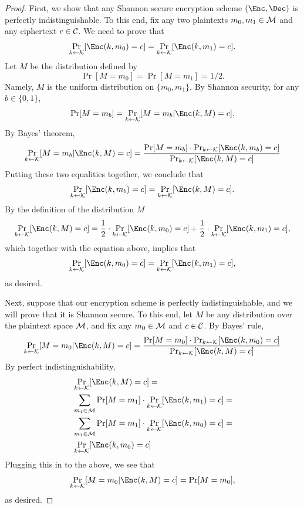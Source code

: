 \begin{proof}
    

 First, we show that any Shannon secure encryption scheme $(\Enc,\Dec)$ is perfectly indistinguishable.  To this end, fix any two plaintexts $m_0,m_1 \in {\cal M}$ and any ciphertext $c \in{\cal C}$.  We need to prove that 
 \[
 \Pr_{k\gets{\cal K}}[\Enc(k,m_0) = c] = \Pr_{k\gets{\cal K}}[\Enc(k,m_1) = c].
 \]
Let $M$ be the distribution defined by 
\[
\Pr[M = m_0] = \Pr[M = m_1] = 1/2.
\]
Namely, $M$ is the uniform distribution on $\{m_0,m_1\}$. By Shannon security, for any $b \in\{0,1\}$,
\[\Pr[M =m_b]= \Pr_{k\gets{\cal K}}[M = m_b | \Enc(k,M) = c] . 
\]
By Bayes’ theorem,
\[
\Pr_{k\gets{\cal K}}[M =m_b | \Enc(k,M) = c] = \frac{\Pr[M = m_b]\cdot \Pr_{k\gets{\cal K}}[\Enc(k,m_b) = c]}{\Pr_{k\gets{\cal K}}[\Enc(k,M) = c]}
\]
Putting these two equalities together, we conclude that \[
{\Pr_{k\gets{\cal K}}[\Enc(k,m_b) = c] }={\Pr_{k\gets{\cal K}}[\Enc(k,M) = c]}.
\]
By the definition of the distribution $M$
\[
{\Pr_{k\gets{\cal K}}[\Enc(k,M) = c]}=\frac12\cdot {\Pr_{k\gets{\cal K}}[\Enc(k,m_0) = c] }+\frac12\cdot {\Pr_{k\gets{\cal K}}[\Enc(k,m_1) = c] },
\]
which together with the equation above, implies that 
\[
\Pr_{k\gets{\cal K}}[\Enc(k,m_0) = c]=\Pr_{k\gets{\cal K}}[\Enc(k,m_1) = c],
\]
as desired.


Next, suppose that our encryption scheme is perfectly indistinguishable, and we will prove that it is Shannon secure.  To this end, let $M$ be any distribution over the plaintext space ${\cal M}$, and fix any $m_0\in{\cal M}$ and $c\in{\cal C}$. By Bayes' rule,
\[
\Pr_{k\gets {\cal K}}[M = m_0 | \Enc(k,M) = c] = \frac{\Pr[M = m_0]\cdot \Pr_{k\gets {\cal K}}[\Enc(k,m_0) = c]}{\Pr_{k\gets {\cal K}}[\Enc(k,M) = c]}
\]
By perfect indistinguishability, 
\begin{align*}
    &\Pr_{k\gets {\cal K}}[\Enc(k,M) = c] =\\  &\sum_{m_1\in{\cal M}} \Pr [M =m_1]\cdot\Pr_{k\gets {\cal K}}[\Enc(k,m_1) = c]  = \\
    &\sum_{m_1\in{\cal M}} \Pr [M =m_1]\cdot\Pr_{k\gets {\cal K}}[\Enc(k,m_0) = c] =\\
    &\Pr_{k\gets {\cal K}}[\Enc(k,m_0) = c]
\end{align*}
Plugging this in to the above, we see that 
\[
\Pr_{k\gets{\cal K}}[M =m_0 | \Enc(k,M) = c] = \Pr[M = m_0] ,
\]
as desired.
\end{proof}

